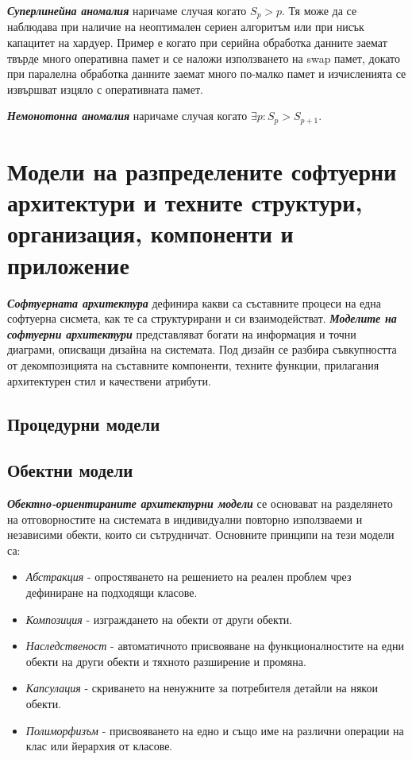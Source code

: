 \documentclass[fleqn,12pt]{article}
\begin{document}
\textbf{\textit{Суперлинейна аномалия}} наричаме случая когато $S_p > p$.
Тя може да се наблюдава при наличие на неоптимален сериен алгоритъм или при нисък капацитет на хардуер.
Пример е когато при серийна обработка данните заемат твърде много оперативна памет и се наложи използването на swap памет, докато при паралелна обработка данните заемат много по-малко памет и изчисленията се извършват изцяло с оперативната памет.

\textbf{\textit{Немонотонна аномалия}} наричаме случая когато $\exists p: S_p > S_{p+1}$.

\section{Модели на разпределените софтуерни архитектури и техните структури, организация, компоненти и приложение}


\textbf{\textit{Софтуерната архитектура}} дефинира какви са съставните процеси на една софтуерна сисмета, как те са структурирани и си взаимодействат.
\textbf{\textit{Моделите на софтуерни архитектури}} представляват богати на информация и точни диаграми, описващи дизайна на системата.
Под дизайн се разбира съвкупността от декомпозицията на съставните компоненти, техните функции, прилагания архитектурен стил и качествени атрибути.

\subsection{Процедурни модели}

\subsection{Обектни модели}

\textbf{\textit{Обектно-ориентираните архитектурни модели}} се основават на разделянето на отговорностите на системата в индивидуални повторно използваеми и независими обекти, които си сътрудничат.
Основните принципи на тези модели са:
\begin{itemize}
    \item \textit{Абстракция} - опростяването на решението на реален проблем чрез дефиниране на подходящи класове.
    \item \textit{Композиция} - изграждането на обекти от други обекти.
    \item \textit{Наследственост} - автоматичното присвояване на функционалностите на едни обекти на други обекти и тяхното разширение и промяна.
    \item \textit{Капсулация} - скриването на ненужните за потребителя детайли на някои обекти.
    \item \textit{Полиморфизъм} - присвояването на едно и също име на различни операции на клас или йерархия от класове.
\end{itemize}
\end{document}
